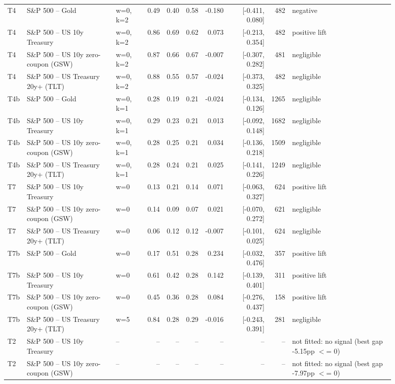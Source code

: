 \begin{figure}
\begin{tabular}{lllrrrrrrl}
T4 & S\&P 500 -- Gold & w=0, k=2 & 0.49 & 0.40 & 0.58 & -0.180 & [-0.411, 0.080] & 482 & negative \\
T4 & S\&P 500 -- US 10y Treasury & w=0, k=2 & 0.86 & 0.69 & 0.62 & 0.073 & [-0.213, 0.354] & 482 & positive lift \\
T4 & S\&P 500 -- US 10y zero-coupon (GSW) & w=0, k=2 & 0.87 & 0.66 & 0.67 & -0.007 & [-0.307, 0.282] & 481 & negligible \\
T4 & S\&P 500 -- US Treasury 20y+ (TLT) & w=0, k=2 & 0.88 & 0.55 & 0.57 & -0.024 & [-0.373, 0.325] & 482 & negligible \\
T4b & S\&P 500 -- Gold & w=0, k=1 & 0.28 & 0.19 & 0.21 & -0.024 & [-0.134, 0.126] & 1265 & negligible \\
T4b & S\&P 500 -- US 10y Treasury & w=0, k=1 & 0.29 & 0.23 & 0.21 & 0.013 & [-0.092, 0.148] & 1682 & negligible \\
T4b & S\&P 500 -- US 10y zero-coupon (GSW) & w=0, k=1 & 0.28 & 0.25 & 0.21 & 0.034 & [-0.136, 0.218] & 1509 & negligible \\
T4b & S\&P 500 -- US Treasury 20y+ (TLT) & w=0, k=1 & 0.28 & 0.24 & 0.21 & 0.025 & [-0.141, 0.226] & 1249 & negligible \\
T7 & S\&P 500 -- US 10y Treasury & w=0 & 0.13 & 0.21 & 0.14 & 0.071 & [-0.063, 0.327] & 624 & positive lift \\
T7 & S\&P 500 -- US 10y zero-coupon (GSW) & w=0 & 0.14 & 0.09 & 0.07 & 0.021 & [-0.070, 0.272] & 621 & negligible \\
T7 & S\&P 500 -- US Treasury 20y+ (TLT) & w=0 & 0.06 & 0.12 & 0.12 & -0.007 & [-0.101, 0.025] & 624 & negligible \\
T7b & S\&P 500 -- Gold & w=0 & 0.17 & 0.51 & 0.28 & 0.234 & [-0.032, 0.476] & 357 & positive lift \\
T7b & S\&P 500 -- US 10y Treasury & w=0 & 0.61 & 0.42 & 0.28 & 0.142 & [-0.139, 0.401] & 311 & positive lift \\
T7b & S\&P 500 -- US 10y zero-coupon (GSW) & w=0 & 0.45 & 0.36 & 0.28 & 0.084 & [-0.276, 0.437] & 158 & positive lift \\
T7b & S\&P 500 -- US Treasury 20y+ (TLT) & w=5 & 0.84 & 0.28 & 0.29 & -0.016 & [-0.243, 0.391] & 281 & negligible \\
T2 & S\&P 500 -- US 10y Treasury & -- & -- & -- & -- & -- & -- & -- & not fitted: no signal (best gap -5.15pp $<$= 0) \\
T2 & S\&P 500 -- US 10y zero-coupon (GSW) & -- & -- & -- & -- & -- & -- & -- & not fitted: no signal (best gap -7.97pp $<$= 0) \\

\end{tabular}
\end{figure}
